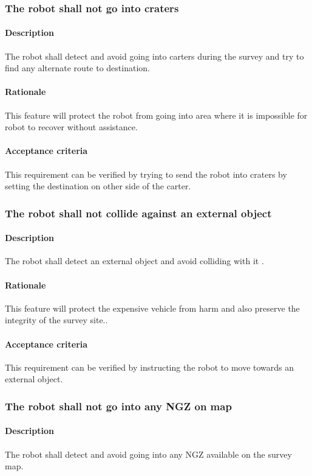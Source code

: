 \documentclass[10pt,a4paper,titlepage]{article}
\begin{document}
    \subsubsection{The robot shall not go into craters}
     \paragraph{Description}   The robot shall detect and avoid going into carters during the survey and try to find any alternate route to destination.
    \paragraph{Rationale}   This feature will protect the robot from going into area where it is impossible for robot to recover without assistance.  
    \paragraph{Acceptance criteria}   This requirement can be verified by trying to send the robot into craters by setting the destination on other side of the carter.
    \subsubsection{ The robot shall not collide against an external object}
     \paragraph{Description}   The robot shall detect an external object and avoid colliding with it .
    \paragraph{Rationale}   This feature will protect the expensive vehicle from harm and also preserve the integrity of the survey site..
    \paragraph{Acceptance criteria}   This requirement can be verified by instructing the robot to move towards an external object.
    \subsubsection{The robot shall not go into any NGZ on map}
     \paragraph{Description}   The robot shall detect and avoid going into any NGZ available on the survey map.
\end{document}

